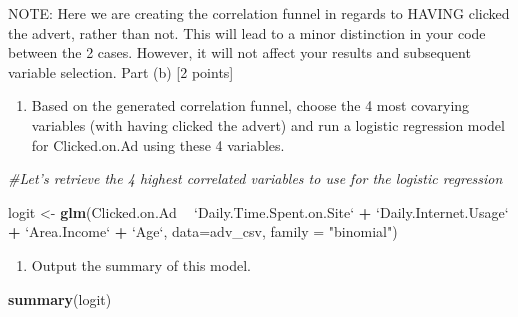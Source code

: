 \documentclass[
]{article}
\newenvironment{Shaded}{\begin{snugshade}}{\end{snugshade}}
\newcommand{\CommentTok}[1]{\textcolor[rgb]{0.56,0.35,0.01}{\textit{#1}}}
\newcommand{\DataTypeTok}[1]{\textcolor[rgb]{0.13,0.29,0.53}{#1}}
\newcommand{\KeywordTok}[1]{\textcolor[rgb]{0.13,0.29,0.53}{\textbf{#1}}}
\newcommand{\NormalTok}[1]{#1}
\newcommand{\OperatorTok}[1]{\textcolor[rgb]{0.81,0.36,0.00}{\textbf{#1}}}
\newcommand{\StringTok}[1]{\textcolor[rgb]{0.31,0.60,0.02}{#1}}
\providecommand{\tightlist}{%
  \setlength{\itemsep}{0pt}\setlength{\parskip}{0pt}}
\begin{document}
NOTE: Here we are creating the correlation funnel in regards to HAVING
clicked the advert, rather than not. This will lead to a minor
distinction in your code between the 2 cases. However, it will not
affect your results and subsequent variable selection. Part (b) {[}2
points{]}

\begin{enumerate}
\def\labelenumi{\arabic{enumi}.}
\tightlist
\item
  Based on the generated correlation funnel, choose the 4 most covarying
  variables (with having clicked the advert) and run a logistic
  regression model for Clicked.on.Ad using these 4 variables.
\end{enumerate}

\begin{Shaded}
\begin{Highlighting}[]
\CommentTok{#Let's retrieve the 4 highest correlated variables to use for the logistic regression}

\NormalTok{logit <-}\StringTok{ }\KeywordTok{glm}\NormalTok{(Clicked.on.Ad }\OperatorTok{~}\StringTok{ `}\DataTypeTok{Daily.Time.Spent.on.Site}\StringTok{`} \OperatorTok{+}\StringTok{ `}\DataTypeTok{Daily.Internet.Usage}\StringTok{`} \OperatorTok{+}\StringTok{ `}\DataTypeTok{Area.Income}\StringTok{`} \OperatorTok{+}\StringTok{ `}\DataTypeTok{Age}\StringTok{`}\NormalTok{, }\DataTypeTok{data=}\NormalTok{adv_csv,}
             \DataTypeTok{family =} \StringTok{"binomial"}\NormalTok{)}
\end{Highlighting}
\end{Shaded}

\begin{enumerate}
\def\labelenumi{\arabic{enumi}.}
\setcounter{enumi}{1}
\tightlist
\item
  Output the summary of this model.
\end{enumerate}

\begin{Shaded}
\begin{Highlighting}[]
\KeywordTok{summary}\NormalTok{(logit)}
\end{Highlighting}
\end{Shaded}
\end{document}
